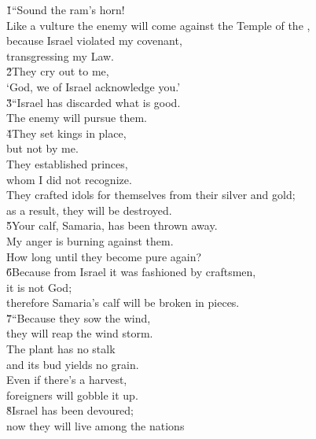 \begin{poetry}
\poeml {}
\v{1}``Sound the ram's horn! \\
\poeml Like a vulture the enemy will come against the Temple of the , \\
\poeml because Israel violated my covenant, \\
\poemll    transgressing my Law. \\
\poeml \v{2}They cry out to me, \\
\poemll    `God, we of Israel acknowledge you.' \\
\poeml \v{3}``Israel has discarded what is good. \\
\poemll    The enemy will pursue them. \\
\poeml \v{4}They set kings in place, \\
\poemll    but not by me. \\
\poeml They established princes, \\
\poemll    whom I did not recognize. \\
\poeml They crafted idols for themselves from their silver and gold; \\
\poemll    as a result, they will be destroyed. \\
\poeml \v{5}Your calf, Samaria, has been thrown away. \\
\poemll    My anger is burning against them. \\
\poemlll       How long until they become pure again? \\
\poeml \v{6}Because from Israel it was fashioned by craftsmen, \\
\poemll    it is not God; \\
\poemlll       therefore Samaria's calf will be broken in pieces. \\
\poeml \v{7}``Because they sow the wind, \\
\poemll    they will reap the wind storm. \\
\poeml The plant has no stalk \\
\poemll    and its bud yields no grain. \\
\poeml Even if there's a harvest, \\
\poemll    foreigners will gobble it up. \\
\poeml \v{8}Israel has been devoured; \\
\poemll    now they will live among the nations \\

\end{poetry}
